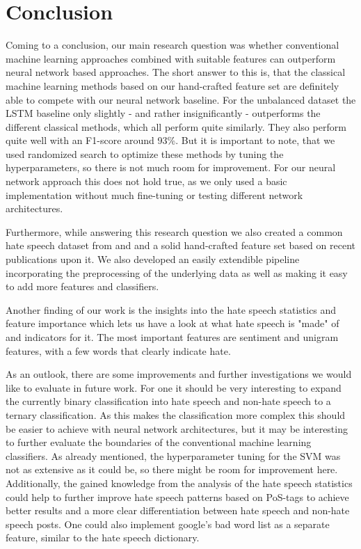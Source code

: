 \section{Conclusion} \label{conclusion}

Coming to a conclusion, our main research question was whether conventional machine learning approaches combined with suitable features can outperform neural network based approaches. The short answer to this is, that the classical machine learning methods based on our hand-crafted feature set are definitely able to compete with our neural network baseline. For the unbalanced dataset the LSTM baseline only slightly - and rather insignificantly - outperforms the different classical methods, which all perform quite similarly. They also perform quite well with an F1-score around 93\%. But it is important to note, that we used randomized search to optimize these methods by tuning the hyperparameters, so there is not much room for improvement. For our neural network approach this does not hold true, as we only used a basic implementation without much fine-tuning or testing different network architectures.

Furthermore, while answering this research question we also created a common hate speech dataset from \cite{ThomasDavidson2020} and \cite{DeGibert2020} and a solid hand-crafted feature set based on recent publications upon it. We also developed an easily extendible pipeline incorporating the preprocessing of the underlying data as well as making it easy to add more features and classifiers.

Another finding of our work is the insights into the hate speech statistics and feature importance which lets us have a look at what hate speech is "made" of and indicators for it. The most important features are sentiment and unigram features, with a few words that clearly indicate hate.

\vspace{0.5cm}

As an outlook, there are some improvements and further investigations we would like to evaluate in future work. For one it should be very interesting to expand the currently binary classification into hate speech and non-hate speech to a ternary classification. As this makes the classification more complex this should be easier to achieve with neural network architectures, but it may be interesting to further evaluate the boundaries of the conventional machine learning classifiers.
As already mentioned, the hyperparameter tuning for the SVM was not as extensive as it could be, so there might be room for improvement here.
Additionally, the gained knowledge from the analysis of the hate speech statistics could help to further improve hate speech patterns based on PoS-tags to achieve better results and a more clear differentiation between hate speech and non-hate speech posts.
One could also implement google's bad word list as a separate feature, similar to the hate speech dictionary.
